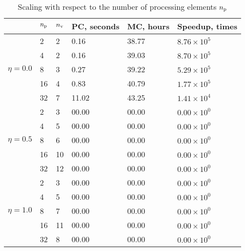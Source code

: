 \begin{table}[h]
  \vspace{-0.5em}
  \centering
  \caption{Scaling with respect to the number of processing elements \textnormal{${n_\text{p}}$}}
  \vspace{-0.5em}
  \begin{tabular*}{1\linewidth}{cL{10pt}L{10pt}R{45pt}R{45pt}R{60pt}}
    \toprule
    & ${n_\text{p}}$ & ${n_\text{v}}$ & PC, seconds & MC, hours & Speedup, times \\
    \midrule
    \midrule
    &  2 & 2 &  0.16 & 38.77 & $8.76 \times 10^5$ \\
    &  4 & 2 &  0.16 & 39.03 & $8.70 \times 10^5$ \\
    &  8 & 3 &  0.27 & 39.22 & $5.29 \times 10^5$ \\
    & 16 & 4 &  0.83 & 40.79 & $1.77 \times 10^5$ \\
    & 32 & 7 & 11.02 & 43.25 & $1.41 \times 10^4$ \\
    \midrule
    &  2 &  3 & 00.00 & 00.00 & $0.00 \times 10^0$ \\
    &  4 &  5 & 00.00 & 00.00 & $0.00 \times 10^0$ \\
    &  8 &  6 & 00.00 & 00.00 & $0.00 \times 10^0$ \\
    & 16 & 10 & 00.00 & 00.00 & $0.00 \times 10^0$ \\
    & 32 & 12 & 00.00 & 00.00 & $0.00 \times 10^0$ \\
    \midrule
    &  2 &  3 & 00.00 & 00.00 & $0.00 \times 10^0$ \\
    &  4 &  5 & 00.00 & 00.00 & $0.00 \times 10^0$ \\
    &  8 &  7 & 00.00 & 00.00 & $0.00 \times 10^0$ \\
    & 16 & 11 & 00.00 & 00.00 & $0.00 \times 10^0$ \\
    & 32 &  8 & 00.00 & 00.00 & $0.00 \times 10^0$ \\
    \bottomrule
  \end{tabular*}
  \vspace{-0.5em}
\end{table}
